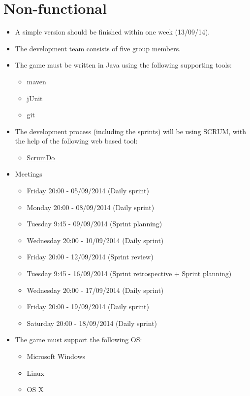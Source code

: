 \documentclass[a4paper,11pt]{article}
\begin{document}
\section*{Non-functional}
\begin{itemize}
  \item A simple version should be finished within one week (13/09/14).
  \item The development team consists of five group members.
  \item The game must be written in Java using the following supporting tools:
  \begin{itemize}
    \item maven
    \item jUnit
    \item git
  \end{itemize}

  \item The development process (including the sprints) will be using SCRUM, with the help of the following web based tool:
  \begin{itemize}
    \item \href{https://www.scrumdo.com/}{ScrumDo}
  \end{itemize}

  \item Meetings
  \begin{itemize}
    \item Friday	20:00 - 05/09/2014 (Daily sprint)
    \item Monday	20:00 - 08/09/2014 (Daily sprint)
    \item Tuesday	 9:45 - 09/09/2014 (Sprint planning)
    \item Wednesday	20:00 - 10/09/2014 (Daily sprint)
    \item Friday	20:00 - 12/09/2014 (Sprint review)
    \item Tuesday	 9:45 - 16/09/2014 (Sprint retrospective + Sprint planning)
    \item Wednesday	20:00 - 17/09/2014 (Daily sprint)
    \item Friday	20:00 - 19/09/2014 (Daily sprint)
    \item Saturday	20:00 - 18/09/2014 (Daily sprint)
  \end{itemize}

  \item The game must support the following OS:
  \begin{itemize}
    \item Microsoft Windows
    \item Linux
    \item OS X
  \end{itemize}
\end{itemize}
\end{document}
